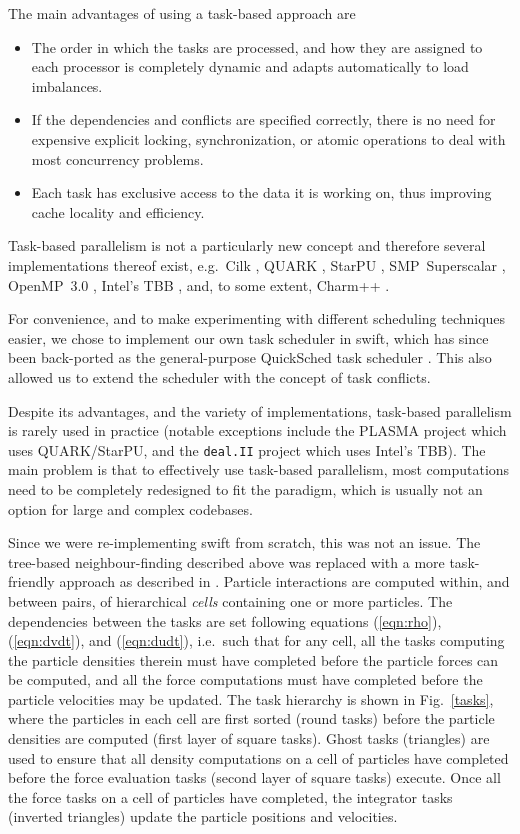 \documentclass{sig-alternate-05-2015}
\newcommand{\eqn}[1] {(\ref{eqn:#1})}
\newcommand{\swift}{{\sc swift}\xspace}
\newcommand{\qs}{{\sc QuickSched}\xspace}
\begin{document}
The main advantages of using a task-based approach are
%
\begin{itemize}
    \item The order in which the tasks are processed, and how they
        are assigned to each processor is completely
        dynamic and adapts automatically to load imbalances.
    \item If the dependencies and conflicts are specified correctly,
        there is no need for expensive explicit locking, synchronization,
        or atomic operations to deal with most concurrency problems.
    \item Each task has exclusive access to the data it is working on,
        thus improving cache locality and efficiency.
\end{itemize}
%
Task-based parallelism is not a particularly new concept and therefore
several implementations thereof exist, e.g.~Cilk \cite{ref:Blumofe1995},
QUARK \cite{ref:QUARK}, StarPU \cite{ref:Augonnet2011},
SMP~Superscalar \cite{ref:SMPSuperscalar}, OpenMP~3.0 \cite{ref:Duran2009},
Intel's TBB \cite{ref:Reinders2007}, and, to some extent,
Charm++ \cite{ref:Kale1993}.

For convenience, and to make experimenting with different scheduling
techniques easier, we chose to implement our own task scheduler
in \swift, which has since been back-ported as the general-purpose
\qs task scheduler \cite{gonnet2013quicksched}.
This also allowed us to extend the scheduler with the concept of
task conflicts.

Despite its advantages, and the variety of implementations,
task-based parallelism is rarely used in
practice (notable exceptions include the PLASMA project
\cite{ref:Agullo2009} which uses QUARK/StarPU, and the {\tt deal.II} project
\cite{ref:Bangerth2007} which uses Intel's TBB).
The main problem is that to effectively use task-based parallelism,
most computations need to be completely redesigned to fit the paradigm,
which is usually not an option for large and complex codebases.

Since we were re-implementing \swift from scratch, this was not an issue.
The tree-based neighbour-finding described above was replaced with a more
task-friendly approach as described in \cite{gonnet2015efficient}.
Particle interactions are computed within, and between pairs, of
hierarchical {\em cells} containing one or more particles.
The dependencies between the tasks are set following
equations \eqn{rho}, \eqn{dvdt}, and \eqn{dudt}, i.e.~such that for any cell,
all the tasks computing the particle densities therein must have
completed before the particle forces can be computed, and all the
force computations must have completed before the particle velocities
may be updated.
The task hierarchy is shown in Fig.~\ref{tasks}, where the particles in each
cell are first sorted (round tasks) before the particle densities
are computed (first layer of square tasks).
Ghost tasks (triangles) are used to ensure that all density computations
on a cell of particles have completed before the force evaluation tasks
(second layer of square tasks) execute.
Once all the force tasks on a cell of particles have completed,
the integrator tasks (inverted triangles) update the particle positions 
and velocities.
\end{document}

